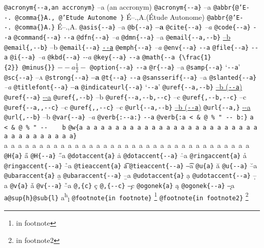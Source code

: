 \documentclass{book}
\newcommand\GNUTexinfocommandstyletextcite[1]{{\normalfont{}\textsl{#1}}}%
\newcommand\GNUTexinfocommandstyletextkbd[1]{{\ttfamily\textsl{#1}}}%
\newcommand\GNUTexinfocommandstyletextvar[1]{{\normalfont{}\textsl{#1}}}%
\begin{document}
\begin{titlepage}
\texttt{@acronym\{{-}{-}a,an accronym\}} --a (an accronym)
\texttt{@acronym\{{-}{-}a\}} --a
\texttt{@abbr\{@'E{-}{-}.\ @comma\{\}A.,\ @'Etude Autonome \}} \'{E}--.\@ ,A.\@ (\'{E}tude Autonome)
\texttt{@abbr\{@'E{-}{-}.\ @comma\{\}A.\}} \'{E}--.\@ ,A.\@
\texttt{@asis\{{-}{-}a\}} --a
\texttt{@b\{{-}{-}a\}} \textbf{--a}
\texttt{@cite\{{-}{-}a\}} \GNUTexinfocommandstyletextcite{--a}
\texttt{@code\{{-}{-}a\}} \texttt{{-}{-}a}
\texttt{@command\{{-}{-}a\}} \texttt{{-}{-}a}
\texttt{@dfn\{{-}{-}a\}} \textsl{--a}
\texttt{@dmn\{{-}{-}a\}} \thinspace --a
\texttt{@email\{{-}{-}a,{-}{-}b\}} \href{mailto:--a}{--b}
\texttt{@email\{,{-}{-}b\}} --b
\texttt{@email\{{-}{-}a\}} \href{mailto:--a}{\nolinkurl{--a}}
\texttt{@emph\{{-}{-}a\}} \emph{--a}
\texttt{@env\{{-}{-}a\}} \texttt{{-}{-}a}
\texttt{@file\{{-}{-}a\}} \texttt{{-}{-}a}
\texttt{@i\{{-}{-}a\}} \textit{--a}
\texttt{@kbd\{{-}{-}a\}} \GNUTexinfocommandstyletextkbd{{-}{-}a}
\texttt{@key\{{-}{-}a\}} \texttt{{-}{-}a}
\texttt{@math\{{-}{-}a \{\textbackslash{}frac\{1\}\{2\}\}\ @minus\{\}\}} $--a {\frac{1}{2}} -$
\texttt{@option\{{-}{-}a\}} \texttt{{-}{-}a}
\texttt{@r\{{-}{-}a\}} \textnormal{--a}
\texttt{@samp\{{-}{-}a\}} `\texttt{{-}{-}a}'
\texttt{@sc\{{-}{-}a\}} \textsc{--a}
\texttt{@strong\{{-}{-}a\}} \textbf{--a}
\texttt{@t\{{-}{-}a\}} \texttt{{-}{-}a}
\texttt{@sansserif\{{-}{-}a\}} \textsf{--a}
\texttt{@slanted\{{-}{-}a\}} \textsl{--a}
\texttt{@titlefont\{{-}{-}a\}} {\huge \bfseries --a}
\texttt{@indicateurl\{{-}{-}a\}} `\texttt{{-}{-}a}'
\texttt{@uref\{{-}{-}a,{-}{-}b\}} \href{--a}{--b (\nolinkurl{--a})}
\texttt{@uref\{{-}{-}a\}} \url{--a}
\texttt{@uref\{,{-}{-}b\}} --b
\texttt{@uref\{{-}{-}a,{-}{-}b,{-}{-}c\}} --c
\texttt{@uref\{,{-}{-}b,{-}{-}c\}} --c
\texttt{@uref\{{-}{-}a{,}{,}{-}{-}c\}} --c
\texttt{@uref\{{,}{,}{-}{-}c\}} --c
\texttt{@url\{{-}{-}a,{-}{-}b\}} \href{--a}{--b (\nolinkurl{--a})}
\texttt{@url\{{-}{-}a,\}} \url{--a}
\texttt{@url\{,{-}{-}b\}} --b
\texttt{@var\{{-}{-}a\}} \GNUTexinfocommandstyletextvar{--a}
\texttt{@verb\{:{-}{-}a:\}} \verb:--a:
\texttt{@verb\{:a  < \& @\ \% " {-}{-}    b:\}} \verb:a  < & @ % " --    b:
\texttt{@w\{a a a a a a a a a a a a a a a a a a a a a a a a a a a a a a a a a a a\}} \hbox{a a a a a a a a a a a a a a a a a a a a a a a a a a a a a a a a a a a}
\texttt{@H\{a\}} \H{a}
\texttt{@H\{{-}{-}a\}} \H{--a}
\texttt{@dotaccent\{a\}} \.{a}
\texttt{@dotaccent\{{-}{-}a\}} \.{--a}
\texttt{@ringaccent\{a\}} \r{a}
\texttt{@ringaccent\{{-}{-}a\}} \r{--a}
\texttt{@tieaccent\{a\}} \t{a}
\texttt{@tieaccent\{{-}{-}a\}} \t{--a}
\texttt{@u\{a\}} \u{a}
\texttt{@u\{{-}{-}a\}} \u{--a}
\texttt{@ubaraccent\{a\}} \b{a}
\texttt{@ubaraccent\{{-}{-}a\}} \b{--a}
\texttt{@udotaccent\{a\}} \d{a}
\texttt{@udotaccent\{{-}{-}a\}} \d{--a}
\texttt{@v\{a\}} \v{a}
\texttt{@v\{{-}{-}a\}} \v{--a}
\texttt{@,\{c\}} \c{c}
\texttt{@,\{{-}{-}c\}} \c{--c}
\texttt{@ogonek\{a\}} \k{a}
\texttt{@ogonek\{{-}{-}a\}} \k{--a}
\texttt{a@sup\{h\}@sub\{l\}} a\textsuperscript{h}\textsubscript{l}
\texttt{@footnote\{in footnote\}} \footnote{in footnote}
\texttt{@footnote\{in footnote2\}} \footnote{in footnote2}


\end{titlepage}
\end{document}

